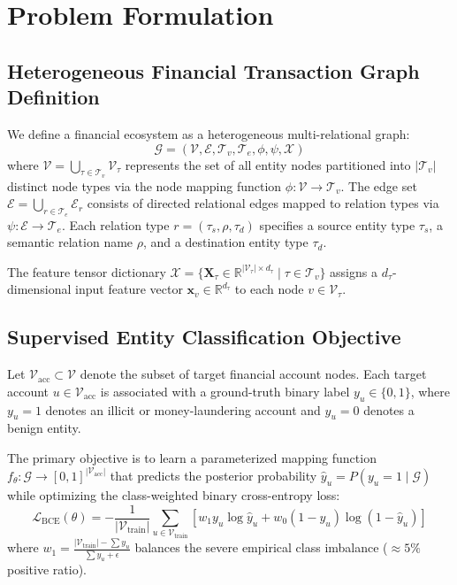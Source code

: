 \section{Problem Formulation}
\label{sec:formulation}

\subsection{Heterogeneous Financial Transaction Graph Definition}
We define a financial ecosystem as a heterogeneous multi-relational graph:
\begin{equation}
    \mathcal{G} = (\mathcal{V}, \mathcal{E}, \mathcal{T}_v, \mathcal{T}_e, \phi, \psi, \mathcal{X})
\end{equation}
where $\mathcal{V} = \bigcup_{\tau \in \mathcal{T}_v} \mathcal{V}_\tau$ represents the set of all entity nodes partitioned into $|\mathcal{T}_v|$ distinct node types via the node mapping function $\phi: \mathcal{V} \to \mathcal{T}_v$. The edge set $\mathcal{E} = \bigcup_{r \in \mathcal{T}_e} \mathcal{E}_r$ consists of directed relational edges mapped to relation types via $\psi: \mathcal{E} \to \mathcal{T}_e$. Each relation type $r = (\tau_s, \rho, \tau_d)$ specifies a source entity type $\tau_s$, a semantic relation name $\rho$, and a destination entity type $\tau_d$.

The feature tensor dictionary $\mathcal{X} = \{\mathbf{X}_\tau \in \mathbb{R}^{|\mathcal{V}_\tau| \times d_\tau} \mid \tau \in \mathcal{T}_v\}$ assigns a $d_\tau$-dimensional input feature vector $\mathbf{x}_v \in \mathbb{R}^{d_\tau}$ to each node $v \in \mathcal{V}_\tau$.

\subsection{Supervised Entity Classification Objective}
Let $\mathcal{V}_{\text{acc}} \subset \mathcal{V}$ denote the subset of target financial account nodes. Each target account $u \in \mathcal{V}_{\text{acc}}$ is associated with a ground-truth binary label $y_u \in \{0, 1\}$, where $y_u = 1$ denotes an illicit or money-laundering account and $y_u = 0$ denotes a benign entity. 

The primary objective is to learn a parameterized mapping function $f_\theta: \mathcal{G} \to [0, 1]^{|\mathcal{V}_{\text{acc}}|}$ that predicts the posterior probability $\hat{y}_u = P(y_u = 1 \mid \mathcal{G})$ while optimizing the class-weighted binary cross-entropy loss:
\begin{equation}
    \mathcal{L}_{\text{BCE}}(\theta) = -\frac{1}{|\mathcal{V}_{\text{train}}|} \sum_{u \in \mathcal{V}_{\text{train}}} \left[ w_1 y_u \log \hat{y}_u + w_0 (1 - y_u) \log (1 - \hat{y}_u) \right]
    \label{eq:bce_loss}
\end{equation}
where $w_1 = \frac{|\mathcal{V}_{\text{train}}| - \sum y_u}{\sum y_u + \epsilon}$ balances the severe empirical class imbalance ($\approx 5\%$ positive ratio).

